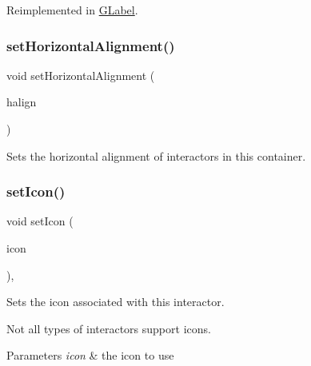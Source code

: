 Reimplemented in \mbox{\hyperlink{classsgl_1_1GLabel_a5eead864d1249c4406f32f9944ed1503}{G\+Label}}.

\mbox{\label{classsgl_1_1GContainer_a901653aacb9991ee9a8b70d4a932f0c9}} 
\subsubsection{\texorpdfstring{set\+Horizontal\+Alignment()}{setHorizontalAlignment()}}
{\footnotesize\ttfamily void set\+Horizontal\+Alignment (\begin{DoxyParamCaption}\item[{\mbox{\hyperlink{namespacesgl_aa00e70829e72ff16addc4d9f06fe3bc5}{Horizontal\+Alignment}}}]{halign }\end{DoxyParamCaption})\hspace{0.3cm}{\ttfamily [virtual]}}



Sets the horizontal alignment of interactors in this container. 

\mbox{\label{classsgl_1_1GInteractor_a542abfcd7261751352af129c7215ecda}} 
\subsubsection{\texorpdfstring{set\+Icon()}{setIcon()}\hspace{0.1cm}{\footnotesize\ttfamily [1/3]}}
{\footnotesize\ttfamily void set\+Icon (\begin{DoxyParamCaption}\item[{const Q\+Icon \&}]{icon }\end{DoxyParamCaption})\hspace{0.3cm}{\ttfamily [virtual]}, {\ttfamily [inherited]}}



Sets the icon associated with this interactor. 

Not all types of interactors support icons. 
\begin{DoxyParams}{Parameters}
{\em icon} & the icon to use \\
\hline
\end{DoxyParams}


